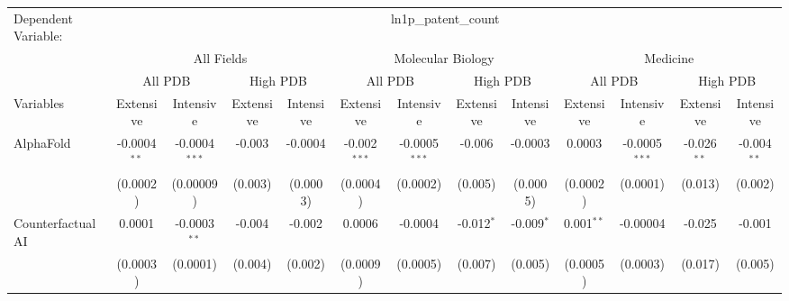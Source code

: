 \begingroup
\centering
\begin{tabular}{lcccccccccccc}
   \tabularnewline \midrule \midrule
   Dependent Variable: & \multicolumn{12}{c}{ln1p\_patent\_count}\\
 & \multicolumn{4}{c}{All Fields} & \multicolumn{4}{c}{Molecular Biology} & \multicolumn{4}{c}{Medicine} \\
\cmidrule(lr){2-5} \cmidrule(lr){6-9} \cmidrule(lr){10-13}
 & \multicolumn{2}{c}{All PDB} & \multicolumn{2}{c}{High PDB} & \multicolumn{2}{c}{All PDB} & \multicolumn{2}{c}{High PDB} & \multicolumn{2}{c}{All PDB} & \multicolumn{2}{c}{High PDB} \\
\cmidrule(lr){2-3} \cmidrule(lr){4-5} \cmidrule(lr){6-7} \cmidrule(lr){8-9} \cmidrule(lr){10-11} \cmidrule(lr){12-13}
Variables & \multicolumn{1}{c}{Extensive} & \multicolumn{1}{c}{Intensive} & \multicolumn{1}{c}{Extensive} & \multicolumn{1}{c}{Intensive} & \multicolumn{1}{c}{Extensive} & \multicolumn{1}{c}{Intensive} & \multicolumn{1}{c}{Extensive} & \multicolumn{1}{c}{Intensive} & \multicolumn{1}{c}{Extensive} & \multicolumn{1}{c}{Intensive} & \multicolumn{1}{c}{Extensive} & \multicolumn{1}{c}{Intensive} \\
\cmidrule(lr){1-1}\cmidrule(lr){2-2} \cmidrule(lr){3-3} \cmidrule(lr){4-4} \cmidrule(lr){5-5} \cmidrule(lr){6-6} \cmidrule(lr){7-7} \cmidrule(lr){8-8} \cmidrule(lr){9-9} \cmidrule(lr){10-10} \cmidrule(lr){11-11} \cmidrule(lr){12-12} \cmidrule(lr){13-13}
   AlphaFold                                & -0.0004$^{**}$ & -0.0004$^{***}$ & -0.003         & -0.0004        & -0.002$^{***}$ & -0.0005$^{***}$ & -0.006       & -0.0003         & 0.0003         & -0.0005$^{***}$  & -0.026$^{**}$  & -0.004$^{**}$\\   
                                            & (0.0002)       & (0.00009)       & (0.003)        & (0.0003)       & (0.0004)       & (0.0002)        & (0.005)      & (0.0005)        & (0.0002)       & (0.0001)         & (0.013)        & (0.002)\\   
   Counterfactual AI                        & 0.0001         & -0.0003$^{**}$  & -0.004         & -0.002         & 0.0006         & -0.0004         & -0.012$^{*}$ & -0.009$^{*}$    & 0.001$^{**}$   & -0.00004         & -0.025         & -0.001\\   
                                            & (0.0003)       & (0.0001)        & (0.004)        & (0.002)        & (0.0009)       & (0.0005)        & (0.007)      & (0.005)         & (0.0005)       & (0.0003)         & (0.017)        & (0.005)\\   

\end{tabular}
